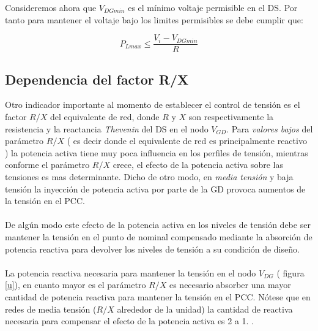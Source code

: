 \documentclass[12pt, letterpaper]{report}
\begin{document}
Consideremos ahora que $V_{DGmin}$ es el mínimo voltaje permisible en el DS. Por tanto para mantener el voltaje bajo los limites permisibles  se debe cumplir que:

\[P_{Lmax} \leq \dfrac{V_{i} - V_{DGmin}}{R}\]

\subsection{Dependencia del factor R/X}
Otro indicador importante al momento de establecer el control de tensión es el factor $ R/X$ del equivalente de red, donde $R$  y $X$ son respectivamente la resistencia y la reactancia  \textit{Thevenin} del DS en el nodo $V_{GD}$.    Para \textit{valores bajos} del parámetro $R/X$ ( es decir donde el equivalente de red es principalmente reactivo ) la potencia activa tiene muy poca  influencia en los perfiles de tensión, mientras conforme el parámetro $R/X$ crece, el efecto de la potencia activa sobre las tensiones es mas determinante. Dicho de otro modo, en \textit{media tensión } y baja tensión la inyección de potencia activa por parte de la GD provoca aumentos de la tensión en el PCC.\\\\
De algún modo este efecto de la potencia activa en los niveles de tensión debe ser mantener la tensión en el punto de nominal compensado mediante la absorción de potencia reactiva para devolver los niveles de tensión a su condición de diseño.\\\\
La potencia reactiva necesaria para mantener la tensión en el nodo $ V_{DG}$ ( figura \ref{u}), en cuanto mayor es el parámetro $R/X$ es necesario absorber una mayor cantidad de potencia reactiva  para mantener la tensión en el PCC. Nótese que en redes de media tensión ($R/X$ alrededor de la unidad) la cantidad de  reactiva necesaria para compensar el efecto de la potencia activa es 2 a 1. \cite{trebolle2012control}.
\end{document}

